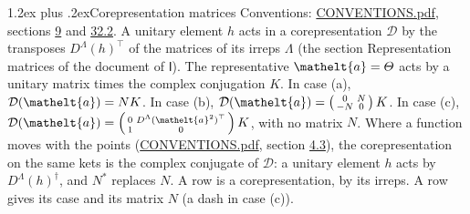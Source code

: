 \documentclass[10pt,a4paper]{article}
\makeatletter
\renewcommand\section{\@startsection{section}{1}{\z@}{-3ex plus -1ex minus -.2ex}%
  {1.2ex plus .2ex}{\normalfont\large\sffamily\bfseries\color{parttitle}}}
\numberwithin{equation}{section}
\newcommand{\eltfont}[1]{{\let\sigma\eltsigma\mathelt{#1}}}
\newcommand{\grp}[1]{\mathsf{#1}}
\newcommand{\elt}[1]{\eltfont{#1}}
\makeatother
\begin{document}
\section{Corepresentation matrices}\label{s:corep_matrices}
Conventions: \href{../../CONVENTIONS.pdf}{CONVENTIONS.pdf}, sections \href{../../../rotation/CONVENTIONS.pdf\#conv.9}{9} and \href{../../CONVENTIONS.pdf\#conv.32.2}{32.2}.
A unitary element $h$ acts in a corepresentation $\mathcal{D}$ by the transposes $D^{\Lambda}(h)^{\top}$ of the matrices of its irreps $\Lambda$ (the section Representation matrices of the document of \href{../../../rotation/data/pdf/I.pdf}{$\grp{I}$}). The representative $\elt{a} = \varTheta$ acts by a unitary matrix times the complex conjugation $K$.
In case (a), $\mathcal{D}(\elt{a}) = NK$. In case (b), $\mathcal{D}(\elt{a}) = \left(\begin{smallmatrix} 0 & N \\ -N & 0 \end{smallmatrix}\right) K$. In case (c), $\mathcal{D}(\elt{a}) = \left(\begin{smallmatrix} 0 & D^{\Lambda}(\elt{a}^2)^{\top} \\ 1 & 0 \end{smallmatrix}\right) K$, with no matrix $N$.
Where a function moves with the points (\href{../../CONVENTIONS.pdf}{CONVENTIONS.pdf}, section \href{../../../rotation/CONVENTIONS.pdf\#conv.4.3}{4.3}), the corepresentation on the same kets is the complex conjugate of $\mathcal{D}$: a unitary element $h$ acts by $D^{\Lambda}(h)^{\dagger}$, and $N^{*}$ replaces $N$.
A row is a corepresentation, by its irreps. A row gives its case and its matrix $N$ (a dash in case (c)).
\end{document}
